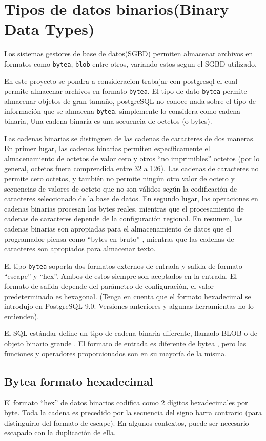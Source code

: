 \section{Tipos de datos binarios(Binary Data Types)}

Los sistemas gestores de base de datos(SGBD) permiten almacenar archivos en formatos como \texttt{bytea}, \texttt{blob} entre otros, variando estos segun el SGBD utilizado. 

En este proyecto se pondra a consideracion trabajar con postgresql el cual permite almacenar archivos en formato \texttt{bytea}. El tipo de dato \texttt{bytea} permite almacenar objetos de gran tama\~no, postgreSQL no conoce nada sobre el tipo de informaci\'on que se almacena \texttt{bytea}, simplemente lo considera como cadena binaria, Una cadena binaria es una secuencia de octetos (o bytes). 

Las cadenas binarias se distinguen de las cadenas de caracteres de dos maneras. En primer lugar, las cadenas binarias permiten espec\'ificamente el almacenamiento de octetos de valor cero y otros ``no imprimibles''  octetos (por lo general, octetos fuera comprendida entre 32 a 126). Las cadenas de caracteres no permite cero octetos, y tambi\'en no permite ning\'un otro valor de octeto y secuencias de valores de octeto que no son v\'alidos seg\'un la codificaci\'on  de caracteres seleccionado de la base de datos. En segundo lugar, las operaciones en cadenas binarias procesan los bytes reales, mientras que el procesamiento de cadenas de caracteres depende de la configuraci\'on regional. En resumen, las cadenas binarias son apropiadas para el almacenamiento de datos que el programador piensa como ``bytes en bruto'' , mientras que las cadenas de caracteres son apropiados para almacenar texto.

El tipo \texttt{bytea} soporta dos formatos externos de entrada y salida de formato ``escape'' y ``hex''. Ambos de estos siempre son aceptados en la entrada. El formato de salida depende del par\'ametro de configuraci\'on, el valor predeterminado es hexagonal. (Tenga en cuenta que el formato hexadecimal se introdujo en PostgreSQL 9.0. Versiones anteriores y algunas herramientas no lo entienden).

El SQL est\'andar define un tipo de cadena binaria diferente, llamado BLOB o de objeto binario grande . El formato de entrada es diferente de bytea , pero las funciones y operadores proporcionados son en su mayoría de la misma.
\subsection{Bytea formato hexadecimal}
El formato ``hex'' de datos binarios codifica como 2 d\'igitos hexadecimales por byte. Toda la cadena es precedido por la secuencia del signo barra contrario (para distinguirlo del formato de escape). En algunos contextos, puede ser necesario escapado con la duplicaci\'on de ella.
